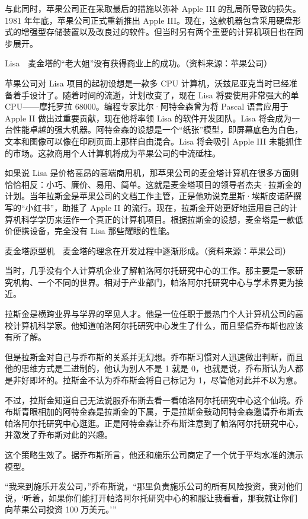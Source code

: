 \documentclass[12pt,UTF8]{ctexbook}
\begin{document}
与此同时，苹果公司正在采取最后的措施以弥补 Apple III 的乱局所导致的损失。1981 年年底，苹果公司正式重新推出 Apple III。现在，这款机器包含采用硬盘形式的增强型存储装置以及改良过的软件。但当时另有两个重要的计算机项目也在同步展开。



Lisa　麦金塔的“老大姐”没有获得商业上的成功。（资料来源：苹果公司）

苹果公司对 Lisa 项目的起初设想是一款多 CPU 计算机，沃兹尼亚克当时已经准备着手设计了。随着时间的流逝，计划改变了，现在 Lisa 将要使用非常强大的单 CPU——摩托罗拉 68000。编程专家比尔·阿特金森曾为将 Pascal 语言应用于 Apple II 做出过重要贡献，现在他将率领 Lisa 的软件开发团队。Lisa 将会成为一台性能卓越的强大机器。阿特金森的设想是一个“纸张”模型，即屏幕底色为白色，文本和图像可以像在印刷页面上那样自由混合。Lisa 将会吸引 Apple III 未能抓住的市场。这款商用个人计算机将成为苹果公司的中流砥柱。

如果说 Lisa 是价格高昂的高端商用机，那苹果公司的麦金塔计算机在很多方面则恰恰相反：小巧、廉价、易用、简单。这就是麦金塔项目的领导者杰夫·拉斯金的计划。当年拉斯金是苹果公司的文档工作主管，正是他劝说克里斯·埃斯皮诺萨撰写的“小红书”，助推了 Apple II 的流行。现在，拉斯金开始更好地运用自己的计算机科学学历来运作一个真正的计算机项目。根据拉斯金的设想，麦金塔是一款低价便携设备，完全没有 Lisa 那些耀眼的性能。



麦金塔原型机　麦金塔的理念在开发过程中逐渐形成。（资料来源：苹果公司）

当时，几乎没有个人计算机企业了解帕洛阿尔托研究中心的工作。那主要是一家研究机构、一个不同的世界。相对于产业部门，帕洛阿尔托研究中心与学术界更为接近。

拉斯金是横跨业界与学界的罕见人才。他是一位任职于最热门个人计算机公司的高校计算机科学家。他知道帕洛阿尔托研究中心发生了什么，而且坚信乔布斯也应该有所了解。

但是拉斯金对自己与乔布斯的关系并无幻想。乔布斯习惯对人迅速做出判断，而且他的思维方式是二进制的，他认为别人不是 1 就是 0，也就是说，乔布斯认为人都是非好即坏的。拉斯金不认为乔布斯会将自己标记为 1，尽管他对此并不以为意。

不过，拉斯金知道自己无法说服乔布斯去看一看帕洛阿尔托研究中心这个仙境。乔布斯青眼相加的阿特金森是拉斯金的下属，于是拉斯金鼓动阿特金森邀请乔布斯去帕洛阿尔托研究中心逛逛。正是阿特金森让乔布斯注意到了帕洛阿尔托研究中心，并激发了乔布斯对此的兴趣。

这个策略生效了。据乔布斯所言，他还和施乐公司商定了一个优于平均水准的演示模型。

“我来到施乐开发公司，”乔布斯说，“那里负责施乐公司的所有风险投资，我对他们说，‘听着，如果你们能打开帕洛阿尔托研究中心的和服让我看看，那我就让你们向苹果公司投资 100 万美元。’”
\end{document}
